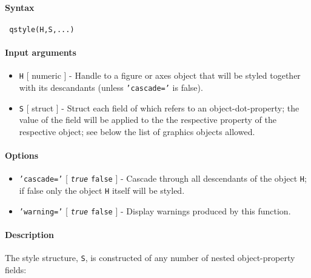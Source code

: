 


	\paragraph{Syntax}
 
 \begin{verbatim}
 qstyle(H,S,...)
 \end{verbatim}
 
 \paragraph{Input arguments}
 
 \begin{itemize}
 \item
   \texttt{H} {[} numeric {]} - Handle to a figure or axes object that
   will be styled together with its descandants (unless
   \texttt{'cascade='} is false).
 \item
   \texttt{S} {[} struct {]} - Struct each field of which refers to an
   object-dot-property; the value of the field will be applied to the the
   respective property of the respective object; see below the list of
   graphics objects allowed.
 \end{itemize}
 
 \paragraph{Options}
 
 \begin{itemize}
 \item
   \texttt{'cascade='} {[} \emph{\texttt{true}} \textbar{} \texttt{false}
   {]} - Cascade through all descendants of the object \texttt{H}; if
   false only the object \texttt{H} itself will be styled.
 \item
   \texttt{'warning='} {[} \emph{\texttt{true}} \textbar{} \texttt{false}
   {]} - Display warnings produced by this function.
 \end{itemize}
 
 \paragraph{Description}
 
 The style structure, \texttt{S}, is constructed of any number of nested
 object-property fields:
 
